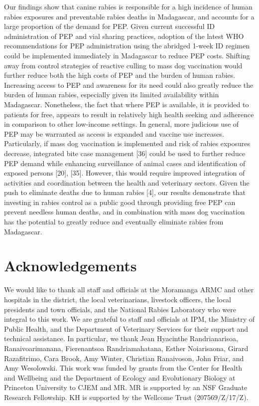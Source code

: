 \documentclass[
]{book}
\begin{document}
Our findings show that canine rabies is responsible for a high incidence of human rabies exposures and preventable rabies deaths in Madagascar, and accounts for a large proportion of the demand for PEP. Given current successful ID administration of PEP and vial sharing practices, adoption of the latest WHO recommendations for PEP administration using the abridged 1-week ID regimen could be implemented immediately in Madagascar to reduce PEP costs. Shifting away from control strategies of reactive culling to mass dog vaccination would further reduce both the high costs of PEP and the burden of human rabies. Increasing access to PEP and awareness for its need could also greatly reduce the burden of human rabies, especially given its limited availability within Madagascar. Nonetheless, the fact that where PEP is available, it is provided to patients for free, appears to result in relatively high health seeking and adherence in comparison to other low-income settings. In general, more judicious use of PEP may be warranted as access is expanded and vaccine use increases. Particularly, if mass dog vaccination is implemented and risk of rabies exposures decrease, integrated bite case management {[}36{]} could be used to further reduce PEP demand while enhancing surveillance of animal cases and identification of exposed persons {[}20{]}, {[}35{]}. However, this would require improved integration of activities and coordination between the health and veterinary sectors. Given the push to eliminate deaths due to human rabies {[}4{]}, our results demonstrate that investing in rabies control as a public good through providing free PEP can prevent needless human deaths, and in combination with mass dog vaccination has the potential to greatly reduce and eventually eliminate rabies from Madagascar.

\hypertarget{acknowledgements}{%
\section{Acknowledgements}\label{acknowledgements}}

We would like to thank all staff and officials at the Moramanga ARMC and other hospitals in the district, the local veterinarians, livestock officers, the local presidents and town officials, and the National Rabies Laboratory who were integral to this work. We are grateful to staff and officials at IPM, the Ministry of Public Health, and the Department of Veterinary Services for their support and technical assistance. In particular, we thank Jean Hyacinthe Randrianarisoa, Ranaivoarimanana, Fierenantsoa Randriamahatana, Esther Noiarisaona, Girard Razafitrimo, Cara Brook, Amy Winter, Christian Ranaivoson, John Friar, and Amy Wesolowski. This work was funded by grants from the Center for Health and Wellbeing and the Department of Ecology and Evolutionary Biology at Princeton University to CJEM and MR. MR is supported by an NSF Graduate Research Fellowship. KH is supported by the Wellcome Trust (207569/Z/17/Z).
\end{document}
